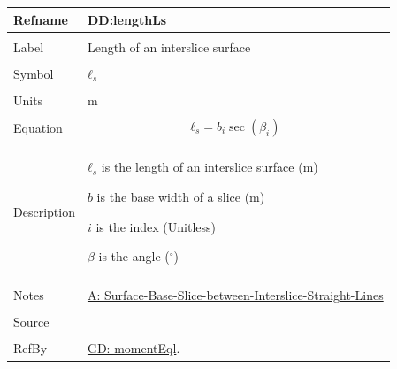 \documentclass[12pt]{article}
\begin{document}
\noindent \begin{minipage}{\textwidth}
\begin{tabular}{p{} p{}}
\toprule \textbf{Refname} & \textbf{DD:lengthLs}
\label{DD:lengthLs}
\\ \midrule \\
Label & Length of an interslice surface
        \\ \midrule \\
        Symbol & ${ℓ_{s}}$
                 \\ \midrule \\
                 Units & m
                         \\ \midrule \\
                         Equation & \begin{displaymath}
                                    {ℓ_{s}}=b_{i} \sec\left(β_{i}\right)
                                    \end{displaymath}
                                    \\ \midrule \\
                                    Description & \begin{symbDescription}
                                                  \item{${ℓ_{s}}$ is the length of an interslice surface (m)}
                                                  \item{$b$ is the base width of a slice (m)}
                                                  \item{$i$ is the index (Unitless)}
                                                  \item{$β$ is the angle (${}^{\circ}$)}
                                                  \end{symbDescription}
                                                  \\ \midrule \\
                                                  Notes & \hyperref[A:Surface-Base-Slice-between-Interslice-Straight-Lines]{A: Surface-Base-Slice-between-Interslice-Straight-Lines}
                                                          \\ \midrule \\
                                                          Source & \cite{fredlund1977}
                                                                   \\ \midrule \\
                                                                   RefBy & \hyperref[GD:momentEql]{GD: momentEql}.
\\ \bottomrule \end{tabular}
\end{minipage}
\par~
\end{document}
